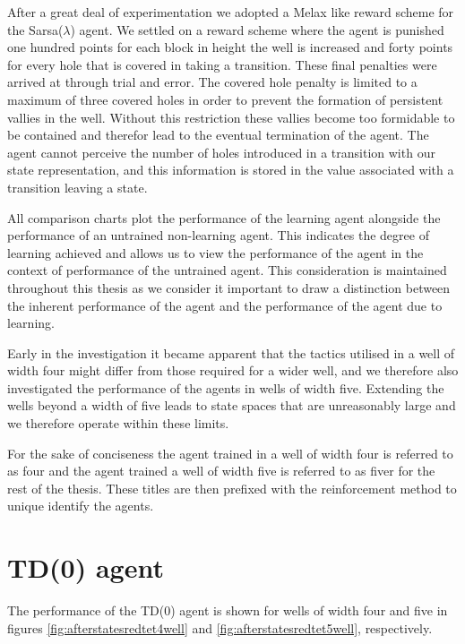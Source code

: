 \documentclass{rucsthesis}
\begin{document}
After a great deal of experimentation we adopted a  Melax like reward scheme for the Sarsa($\lambda$) agent. We settled on a reward scheme where the agent is punished one hundred points for each block in height the well is increased and forty points for every hole that is covered in taking a transition. These final penalties were arrived at through trial and error. The covered hole penalty is limited to a maximum of three covered holes in order to prevent the formation of persistent vallies in the well. Without this restriction these vallies become too formidable to be contained and therefor lead to the eventual termination of the agent.  The agent cannot perceive the number of holes introduced in a transition with our state representation, and this information is stored in the value associated with a transition leaving a state.

All comparison charts plot the performance of the learning agent alongside the performance of an untrained non-learning agent. This indicates the degree of learning achieved and allows us to view the performance of the agent in the context of performance of the untrained agent. This consideration is maintained throughout this thesis as we consider it important to draw a distinction between the inherent performance of the agent and the performance of the agent due to learning.

Early in the investigation it became apparent that the tactics utilised in a well of width four might differ from those required for a wider well, and we therefore also investigated the performance of the agents in wells of width five. Extending the wells beyond a width of five leads to state spaces that are unreasonably large and we therefore operate within these limits.

For the sake of conciseness the agent trained in a well of width four is referred to as four and the agent trained a well of width five is referred to as fiver for the rest of the thesis. These titles are then prefixed with the reinforcement method to unique identify the agents.

\section{TD(0) agent}

The performance of the TD(0) agent is shown for wells of width four and five in figures \ref{fig:afterstatesredtet4well} and \ref{fig:afterstatesredtet5well}, respectively.
\end{document}
